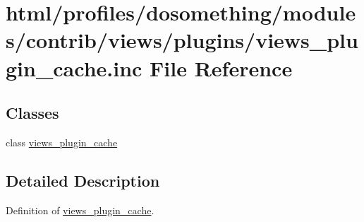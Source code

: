 \hypertarget{views__plugin__cache_8inc}{
\section{html/profiles/dosomething/modules/contrib/views/plugins/views\_\-plugin\_\-cache.inc File Reference}
\label{views__plugin__cache_8inc}
}
\subsection*{Classes}
\begin{DoxyCompactItemize}
\item 
class \hyperlink{classviews__plugin__cache}{views\_\-plugin\_\-cache}
\end{DoxyCompactItemize}


\subsection{Detailed Description}
Definition of \hyperlink{classviews__plugin__cache}{views\_\-plugin\_\-cache}. 
